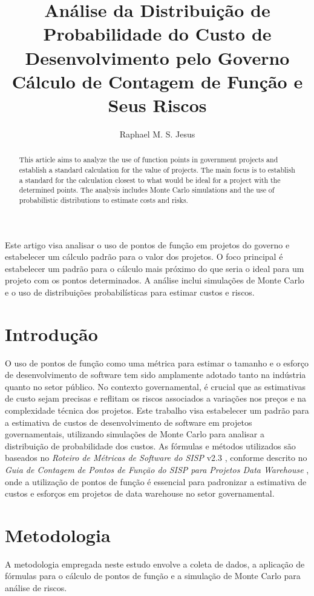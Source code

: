\documentclass[12pt]{article}
\title{Análise da Distribuição de Probabilidade do Custo de Desenvolvimento pelo Governo\\ Cálculo de Contagem de Função e Seus Riscos}
\author{Raphael M. S. Jesus\inst{1}}
\begin{document}
\maketitle

\begin{abstract}
  This article aims to analyze the use of function points in government projects and establish a standard calculation for the value of projects. The main focus is to establish a standard for the calculation closest to what would be ideal for a project with the determined points. The analysis includes Monte Carlo simulations and the use of probabilistic distributions to estimate costs and risks.
\end{abstract}

\begin{resumo}
  Este artigo visa analisar o uso de pontos de função em projetos do governo e estabelecer um cálculo padrão para o valor dos projetos. O foco principal é estabelecer um padrão para o cálculo mais próximo do que seria o ideal para um projeto com os pontos determinados. A análise inclui simulações de Monte Carlo e o uso de distribuições probabilísticas para estimar custos e riscos.
\end{resumo}

\section{Introdução}

O uso de pontos de função como uma métrica para estimar o tamanho e o esforço de desenvolvimento de software tem sido amplamente adotado tanto na indústria quanto no setor público. No contexto governamental, é crucial que as estimativas de custo sejam precisas e reflitam os riscos associados a variações nos preços e na complexidade técnica dos projetos. Este trabalho visa estabelecer um padrão para a estimativa de custos de desenvolvimento de software em projetos governamentais, utilizando simulações de Monte Carlo para analisar a distribuição de probabilidade dos custos. As fórmulas e métodos utilizados são baseados no \textit{Roteiro de Métricas de Software do SISP} v2.3 \cite{sisp}, conforme descrito no \textit{Guia de Contagem de Pontos de Função do SISP para Projetos Data Warehouse} \cite{guia-dw}, onde a utilização de pontos de função é essencial para padronizar a estimativa de custos e esforços em projetos de data warehouse no setor governamental.

\section{Metodologia}
A metodologia empregada neste estudo envolve a coleta de dados, a aplicação de fórmulas para o cálculo de pontos de função e a simulação de Monte Carlo para análise de riscos.
\end{document}
